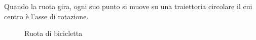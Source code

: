 Quando la ruota gira, ogni suo punto si muove su una traiettoria circolare il cui centro è l’asse di rotazione.


\begin{figure}[H]
    \centering
    \def\R{1.6} %
    \caption{Ruota di bicicletta}
    \label{fig:ruotaBici}
\end{figure}

\newpage

